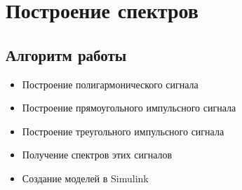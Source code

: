 \documentclass[10pt,a4paper]{report}
\begin{document}
\chapter{Построение спектров}
\section{Алгоритм работы}
\begin{itemize}
\item Построение полигармонического сигнала
\item Построение прямоугольного импульсного сигнала
\item Построение треугольного импульсного сигнала
\item Получение спектров этих сигналов
\item Создание моделей в Simulink
\end{itemize}
\end{document}

